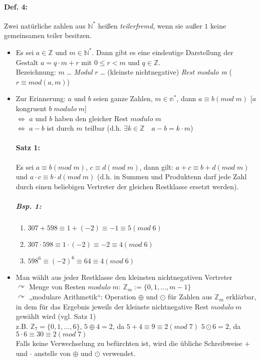 \paragraph{Def. 4:}\parskp
Zwei natürliche zahlen aus $\mathbb{N}^*$ heißen \emph{teilerfremd}, wenn sie außer $1$ keine gemeinsamen teiler besitzen.
\begin{itemize}
\item Es sei $a \in \mathbb{Z}$ und $m\in\mathbb{N}^*$. Dann gibt es eine eindeutige Darstellung der Gestalt $\boxed{a=q\cdot m + r}$ mit $\boxed{0\leq r < m}$ und $q \in \mathbb{Z}$.\\
Bezeichnung: $m$ … \emph{Modul} \qquad $r$ … (kleinste nichtnegative) \emph{Rest modulo m} ($r \equiv mod (a,m)$)
\item Zur Erinnerung: $a$ und $b$ seien ganze Zahlen, $m\in \mathbb{n}^*$, dann $a\equiv b (mod\; m)$ [$a$ kongruent $b\; modulo\; m$]\\
$\Leftrightarrow$ $a$ und $b$ haben den gleicher Rest $modulo\; m$\\
$\Leftrightarrow$ $a-b$ ist durch $m$ teilbar (d.h. $\exists k \in \mathbb{Z} \quad a-b = k\cdot m$)
\paragraph{Satz 1:} \parskp
Es sei $a \equiv b (mod\; m)$, $c\equiv d (mod\; m)$, dann gilt: $a+c \equiv b+d (mod \;m)$ und $a\cdot c \equiv b \cdot d (mod\; m)$ (d.h. in Summen und Produktenn darf jede Zahl durch einen beliebigen Vertreter der gleichen Restklasse ersetzt werden).
\subparagraph{Bsp. 1:} 
\begin{enumerate}[label=\alph*)]
\item $307+598 \equiv 1+(-2)\equiv -1 \equiv 5 (mod \; 6)$
\item $307\cdot 598 \equiv 1 \cdot (-2) \equiv -2 \equiv 4 (mod \; 6)$
\item $598^6 \equiv (-2)^6\equiv 64 \equiv 4 (mod \; 6)$
\end{enumerate}
\item Man wählt aus jeder Restklasse den kleinsten nichtnegativen Vertreter \\
$\curvearrowright$ Menge von Resten $modulo \; m$: $\mathbb{Z}_m:= \{0,1,...,m-1\}$ \\
$\curvearrowright$ „modulare Arithmetik“: Operation $\oplus$ und $\odot$ für Zahlen aus $\mathbb{Z}_m$ erklärbar, in dem für das Ergebnis jeweils der kleinste nichtnegative Rest $modulo \; m$ gewählt wird (vgl. Satz 1)\\
z.B. $\mathbb{Z}_7 = \{ 0,1,..., 6\}$, \quad $5\oplus 4=2$, da $5+4\equiv 9\equiv 2 (mod \; 7)$ \quad $5\odot 6=2$, da $5\cdot 6\equiv 30 \equiv 2 (mod \;7)$\smallskip\\
Falls keine Verwechselung zu befürchten ist, wird die übliche Schreibweise $+$ und $\cdot$ anstelle von $\oplus$ und $\odot$ verwendet.
\end{itemize}

